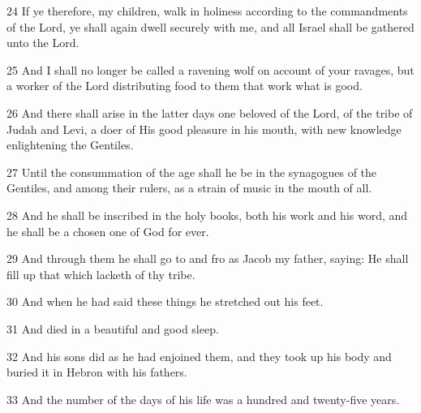 \par 24 If ye therefore, my children, walk in holiness according to the commandments of the Lord, ye shall again dwell securely with me, and all Israel shall be gathered unto the Lord.

\par 25 And I shall no longer be called a ravening wolf on account of your ravages, but a worker of the Lord distributing food to them that work what is good.

\par 26 And there shall arise in the latter days one beloved of the Lord, of the tribe of Judah and Levi, a doer of His good pleasure in his mouth, with new knowledge enlightening the Gentiles.

\par 27 Until the consummation of the age shall he be in the synagogues of the Gentiles, and among their rulers, as a strain of music in the mouth of all.

\par 28 And he shall be inscribed in the holy books, both his work and his word, and he shall be a chosen one of God for ever.

\par 29 And through them he shall go to and fro as Jacob my father, saying: He shall fill up that which lacketh of thy tribe.

\par 30 And when he had said these things he stretched out his feet.

\par 31 And died in a beautiful and good sleep.

\par 32 And his sons did as he had enjoined them, and they took up his body and buried it in Hebron with his fathers.

\par 33 And the number of the days of his life was a hundred and twenty-five years.


